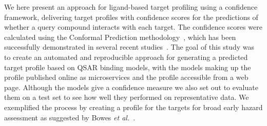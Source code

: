 \documentclass[utf8]{frontiersSCNS} %
\begin{document}
We here present an approach for ligand-based target profiling using a
confidence framework, delivering target profiles with confidence scores for the
predictions of whether a query compound interacts with each target. The
confidence scores were calculated using the Conformal Prediction
methodology~\cite{Vovk2005}, which has been successfully demonstrated in several recent studies~\cite{Cortes-Ciriano:2015ec,Norinder:2014fe,Forreryd:2018kb,Norinder:2016qf}.
%
The goal of this study was to create an automated and reproducible approach for
generating a predicted target profile based on QSAR binding models, with the models
making up the profile published online as microservices and the profile
accessible from a web page. Although the models give a confidence measure we
also set out to evaluate them on a test set to see how well they performed on
representative data. We exemplified the process by creating a profile for the
targets for broad early hazard assessment as suggested by Bowes \textit{et
al.}~\cite{Bowes2012}.
\end{document}
